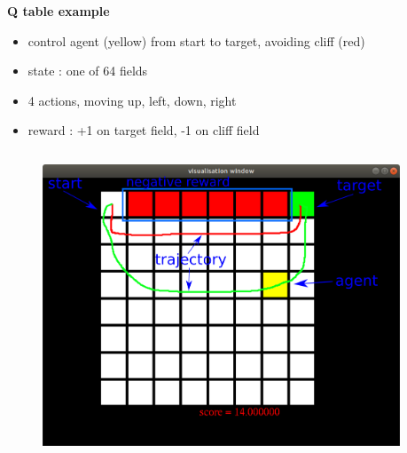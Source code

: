 \documentclass[xcolor=dvipsnames]{beamer}
\begin{document}
\begin{frame}{\bf Q table example}


\begin{itemize}
  \item control agent (yellow) from start to target, avoiding cliff (red)
  \item state  : one of 64 fields
  \item 4 actions, moving up, left, down, right
  \item reward : +1 on target field, -1 on cliff field
\end{itemize}



\begin{columns}
\begin{column}{0.4\textwidth}

    \begin{figure}
      \includegraphics[scale=0.2]{./diagrams/cliff_diagram.png}
    \end{figure}


\end{column}
\begin{column}{0.5\textwidth}  %



\end{column}
\end{columns}
\end{frame}
\end{document}
